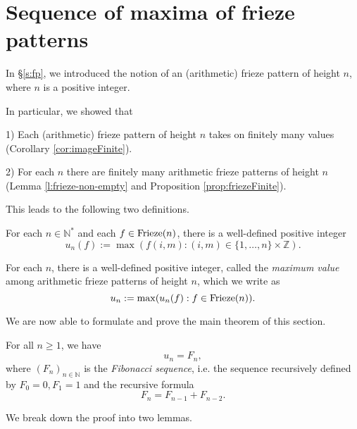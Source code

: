 \chapter{Sequence of maxima of frieze patterns}
In \S \ref{s:fp}, we introduced the notion of an (arithmetic) frieze pattern of height $n$, where $n$ is a positive integer.

In particular, we showed that 

1) Each (arithmetic) frieze pattern of height $n$ takes on finitely many values (Corollary \ref{cor:imageFinite}). 

2) For each $n$ there are finitely many arithmetic frieze patterns of height $n$ (Lemma \ref{l:frieze-non-empty} and 
Proposition \ref{prop:friezeFinite}).

This leads to the following two definitions.
\begin{definition}
    \label{def:un(f)}
For each $n \in \mathbb{N}^*$ and each $f \in {\rm Frieze}(n)$, there is a well-defined positive integer
\[
    u_n(f) := \max ( f (i,m) : (i,m)  \in \{1,\ldots,n \}\times \mathbb{Z}).
\]
\end{definition}

\begin{definition}
    \label{def:un}
    For each $n$, there is a well-defined
    positive integer, called the {\it maximum value} among arithmetic frieze patterns of height $n$, which we write as
    \[
        u_n := \max (u_n(f) : f \in  {\rm Frieze}(n)).
    \]
\end{definition}


We are now able to formulate and prove the main theorem of this section.
\begin{theorem}
    \label{MainTheorem}
    For all $n \geq 1$, we have 
    \[
        u_n = F_{n},
    \]
    where $(F_{n})_{n \in \mathbb{N}}$ is the {\it Fibonacci sequence}, i.e. the sequence recursively defined by 
    $F_0 = 0, F_1 = 1$ and the recursive formula
    \[
        F_n = F_{n-1} + F_{n-2}.
    \]
\end{theorem}
We break down the proof into two lemmas. 

